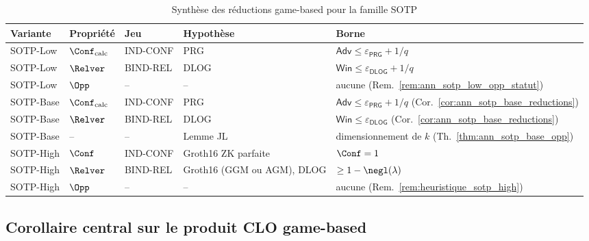 \begin{sloppypar}
\begin{table}[htbp]
\centering
\caption{Synth\`ese des r\'eductions game-based pour la famille SOTP}
\label{tab:ann_g_reductions}
\begin{tabular}{@{}lllll@{}}
\toprule
\textbf{Variante} & \textbf{Propri\'et\'e} & \textbf{Jeu} &
\textbf{Hypoth\`ese} & \textbf{Borne} \\
\midrule
SOTP-Low & $\Conf_{\mathrm{calc}}$ & IND-CONF & PRG
  & $\mathsf{Adv} \leq \varepsilon_{\mathsf{PRG}} + 1/q$ \\
SOTP-Low & $\Relver$ & BIND-REL & DLOG
  & $\mathsf{Win} \leq \varepsilon_{\mathsf{DLOG}} + 1/q$ \\
SOTP-Low & $\Opp$ & -- & --
  & aucune (Rem.~\ref{rem:ann_sotp_low_opp_statut}) \\
\midrule
SOTP-Base & $\Conf_{\mathrm{calc}}$ & IND-CONF & PRG
  & $\mathsf{Adv} \leq \varepsilon_{\mathsf{PRG}} + 1/q$ (Cor.~\ref{cor:ann_sotp_base_reductions}) \\
SOTP-Base & $\Relver$ & BIND-REL & DLOG
  & $\mathsf{Win} \leq \varepsilon_{\mathsf{DLOG}}$ (Cor.~\ref{cor:ann_sotp_base_reductions}) \\
SOTP-Base & -- & -- & Lemme JL
  & dimensionnement de $k$ (Th.~\ref{thm:ann_sotp_base_opp}) \\
\midrule
SOTP-High & $\Conf$ & IND-CONF & Groth16 ZK parfaite
  & $\Conf = 1$ \\
SOTP-High & $\Relver$ & BIND-REL & Groth16 (GGM ou AGM), DLOG
  & $\geq 1-\negl(\lambda)$ \\
SOTP-High & $\Opp$ & -- & --
  & aucune (Rem.~\ref{rem:heuristique_sotp_high}) \\
\bottomrule
\end{tabular}
\end{table}

\subsection{Corollaire central sur le produit CLO game-based}


\end{sloppypar}
